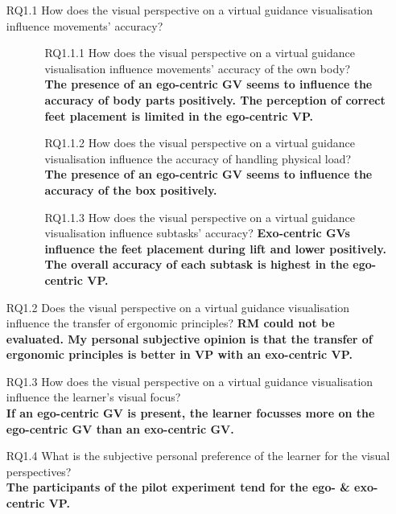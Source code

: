 \begin{enumerate}[align=left, leftmargin=0pt, labelindent=\parindent,
	listparindent=\parindent, labelwidth=0pt, itemindent=!]
	\item[RQ1.1] How does the visual perspective on a virtual guidance visualisation influence movements' accuracy?
	\begin{itemize}
		\item[] \begin{itemize}
			\item[RQ1.1.1] How does the visual perspective on a virtual guidance visualisation influence movements' accuracy of the own body?\\
			\textbf{The presence of an ego-centric GV seems to influence the accuracy of body parts positively. The perception of correct feet placement is limited in the ego-centric VP.}
			\item[RQ1.1.2] How does the visual perspective on a virtual guidance visualisation influence the accuracy of handling physical load?\\
			\textbf{The presence of an ego-centric GV seems to influence the accuracy of the box positively.}
			\item[RQ1.1.3] How does the visual perspective on a virtual guidance visualisation influence subtasks' accuracy?
			\textbf{Exo-centric GVs influence the feet placement during lift and lower positively. The overall accuracy of each subtask is highest in the ego-centric VP.}
		\end{itemize}
	\end{itemize}
	
	\item[RQ1.2] Does the visual perspective on a virtual guidance visualisation influence the transfer of ergonomic principles?
	\textbf{RM could not be evaluated. My personal subjective opinion is that the transfer of ergonomic principles is better in VP with an exo-centric VP.}
	\item[RQ1.3] How does the visual perspective on a virtual guidance visualisation influence the learner's visual focus?\\
	\textbf{If an ego-centric GV is present, the learner focusses more on the ego-centric GV than an exo-centric GV.}
	\item[RQ1.4] What is the subjective personal preference of the learner for the visual perspectives?\\
	\textbf{The participants of the pilot experiment tend for the ego- \& exo-centric VP.}
\end{enumerate}

